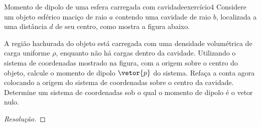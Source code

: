 \begin{exercício}{Momento de dipolo de uma esfera carregada com cavidade}{exercício4}
    Considere um objeto esférico maciço de raio \(a\) contendo uma cavidade de raio \(b\), localizada a uma distância \(d\) de seu centro, como mostra a figura abaixo.
    \begin{center}
    \end{center}
    A região hachurada do objeto está carregada com uma densidade volumétrica de carga uniforme \(\rho\), enquanto não há cargas dentro da cavidade. Utilizando o sistema de coordenadas mostrado na figura, com a origem sobre o centro do objeto, calcule o momento de dipolo \(\vetor{p}\) do sistema. Refaça a conta agora colocando a origem do sistema de coordenadas sobre o centro da cavidade. Determine um sistema de coordenadas sob o qual o momento de dipolo é o vetor nulo.
\end{exercício}
\begin{proof}[Resolução]

\end{proof}
